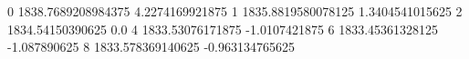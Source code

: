 0 1838.7689208984375 4.2274169921875
1 1835.8819580078125 1.3404541015625
2 1834.54150390625 0.0
4 1833.53076171875 -1.0107421875
6 1833.45361328125 -1.087890625
8 1833.578369140625 -0.963134765625
